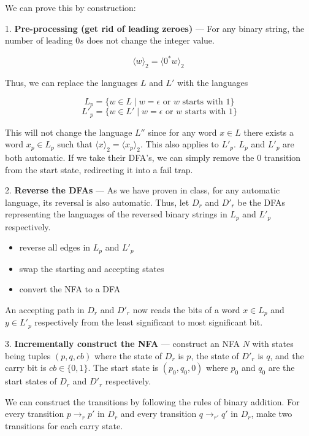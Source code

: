 \documentclass[12pt]{article}
\begin{document}
\begin{solution}
    \bbni
    
    We can prove this by construction:

    1. \textbf{Pre-processing (get rid of leading zeroes)} — For any binary string, the number of leading $0s$ does not change the integer value.

    \[
    \langle w \rangle_2 = \langle 0^* w \rangle_2\
    \]
    
    Thus, we can replace the languages $L$ and $L'$ with the languages 

    \[
    L_p = \{ w \in L \mid w = \epsilon \text{ or } w \text{ starts with } 1 \}
    \]
    \[
    L'_p = \{ w \in L' \mid w = \epsilon \text{ or } w \text{ starts with } 1 \}
    \]

    This will not change the language $L''$ since for any word $x \in L$ there exists a word $x_p \in L_p$ such that     $\langle x \rangle_2 = \langle x_p \rangle_2$. This also applies to $L'_p$. $L_p$ and $L'_p$ are both automatic. If we take their DFA's, we can simply remove the $0$ transition from the start state, redirecting it into a fail trap.

    2. \textbf{Reverse the DFAs} — As we have proven in class, for any automatic language, its reversal is also automatic. Thus, let $D_r$ and $D'_r$ be the DFAs representing the languages of the reversed binary strings in $L_p$ and $L'_p$ respectively.
    \begin{itemize}
        \item reverse all edges in $L_p$ and $L'_p$
        \item swap the starting and accepting states
        \item convert the NFA to a DFA
    \end{itemize}
An accepting path in $D_r$ and $D'_r$ now reads the bits of a word $x \in L_p$ and $y \in L'_p$ respectively from the least significant to most significant bit.


    3. \textbf{Incrementally construct the NFA} — construct an NFA $N$ with states being tuples $(p, q, cb)$ where the state of $D_r$ is $p$, the state of $D'_r$ is $q$, and the carry bit is $cb \in \{0, 1\}$. The start state is $(p_0, q_0, 0)$ where $p_0$ and $q_0$ are the start states of $D_r$ and $D'_r$ respectively. 

    We can construct the transitions by following the rules of binary addition. For every transition $p\rightarrow_r p'$ in $D_r$ and every transition $q\rightarrow_{r'} q'$ in $D_r$, make two transitions for each carry state.


\end{solution}
\end{document}
